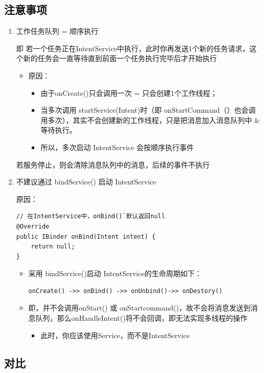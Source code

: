 \documentclass[9pt, b5paper]{article}
\begin{document}
\subsection{注意事项}
\label{sec-4-9}
\begin{enumerate}
\item 工作任务队列 = 顺序执行
\label{sec-4-9-0-1}

即 若一个任务正在IntentService中执行，此时你再发送1个新的任务请求，这个新的任务会一直等待直到前面一个任务执行完毕后才开始执行
\begin{itemize}
\item 原因：
\begin{itemize}
\item 由于onCreate()只会调用一次 = 只会创建1个工作线程；
\item 当多次调用 startService(Intent)时（即 onStartCommand（）也会调用多次），其实不会创建新的工作线程，只是把消息加入消息队列中 \& 等待执行。
\item 所以，多次启动 IntentService 会按顺序执行事件
\end{itemize}
\end{itemize}

若服务停止，则会清除消息队列中的消息，后续的事件不执行
\item 不建议通过 bindService() 启动 IntentService
\label{sec-4-9-0-2}

原因：
\begin{verbatim}
// 在IntentService中，onBind()`默认返回null
@Override
public IBinder onBind(Intent intent) {
    return null;
}
\end{verbatim}
\begin{itemize}
\item 采用 bindService()启动 IntentService的生命周期如下：
\begin{verbatim}
onCreate() ->> onBind() ->> onUnbind()->> onDestory()
\end{verbatim}
\item 即，并不会调用onStart() 或 onStartcommand()，故不会将消息发送到消息队列，那么onHandleIntent()将不会回调，即无法实现多线程的操作
\begin{itemize}
\item 此时，你应该使用Service，而不是IntentService
\end{itemize}
\end{itemize}
\end{enumerate}
\subsection{对比}
\label{sec-4-10}
\end{document}
